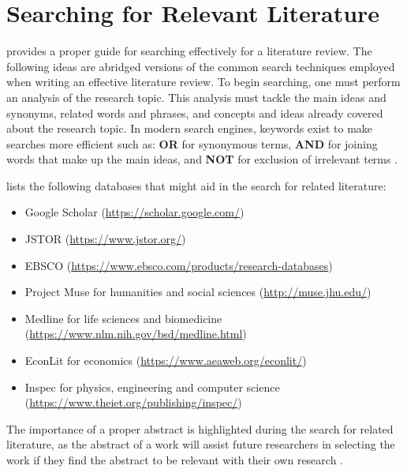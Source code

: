 \documentclass{strrespaper-trad}
\begin{document}
		\section*{Searching for Relevant Literature}
			\textcite{hardyGuidesLiteratureReview2020} provides a proper guide for searching effectively for a literature review.
			The following ideas are abridged versions of the common search techniques employed when writing an effective literature review.
			To begin searching, one must perform an analysis of the research topic.
			This analysis must tackle the main ideas and synonyms, related words and phrases, and concepts and ideas already covered about the research topic.
			In modern search engines, keywords exist to make searches more efficient such as: \textbf{OR} for synonymous terms, \textbf{AND} for joining words that make up the main ideas, and \textbf{NOT} for exclusion of irrelevant terms \autocite{hardyGuidesLiteratureReview2020}.

			\textcite{mccombesLiteratureReviewComplete2019} lists the following databases that might aid in the search for related literature:
			\begin{itemize}
				\item Google Scholar (\url{https://scholar.google.com/})
				\item JSTOR (\url{https://www.jstor.org/})
				\item EBSCO (\url{https://www.ebsco.com/products/research-databases})
				\item Project Muse for humanities and social sciences (\url{http://muse.jhu.edu/})
				\item Medline for life sciences and biomedicine (\url{https://www.nlm.nih.gov/bsd/medline.html})
				\item EconLit for economics (\url{https://www.aeaweb.org/econlit/})
				\item Inspec for physics, engineering and computer science (\url{https://www.theiet.org/publishing/inspec/})
			\end{itemize}
			The importance of a proper abstract is highlighted during the search for related literature, as the abstract of a work will assist future researchers in selecting the work if they find the abstract to be relevant with their own research \autocite{mccombesLiteratureReviewComplete2019}.
\end{document}

